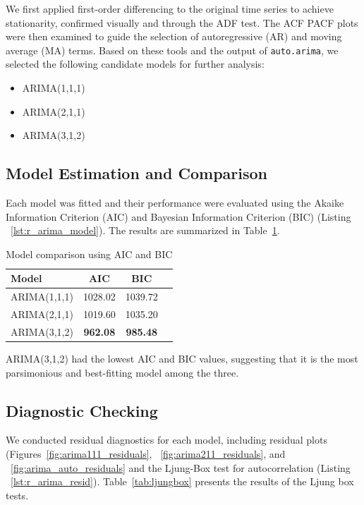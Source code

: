 \documentclass{article}
\begin{document}
We first applied first-order differencing to the original time series to achieve stationarity, confirmed visually and through the ADF test. The ACF PACF plots were then examined to guide the selection of autoregressive (AR) and moving average (MA) terms. Based on these tools and the output of \texttt{auto.arima}, we selected the following candidate models for further analysis:

\begin{itemize}
    \item ARIMA(1,1,1)
    \item ARIMA(2,1,1)
    \item ARIMA(3,1,2)
\end{itemize}

\subsection{Model Estimation and Comparison}

Each model was fitted and their performance were evaluated using the Akaike Information Criterion (AIC) and Bayesian Information Criterion (BIC) (Listing ~\ref{lst:r_arima_model}). The results are summarized in Table~\ref{tab:model_comparison}.

\begin{table}[h!]
\centering
\caption{Model comparison using AIC and BIC}
\label{tab:model_comparison}
\begin{tabular}{lccc}
\toprule
\textbf{Model} & \textbf{AIC} & \textbf{BIC} \\
\midrule
ARIMA(1,1,1) & 1028.02 & 1039.72  \\
ARIMA(2,1,1) & 1019.60 & 1035.20  \\
ARIMA(3,1,2) & \textbf{962.08} & \textbf{985.48}  \\
\bottomrule
\end{tabular}
\end{table}

ARIMA(3,1,2) had the lowest AIC and BIC values, suggesting that it is the most parsimonious and best-fitting model among the three.

\subsection{Diagnostic Checking}

We conducted residual diagnostics for each model, including residual plots (Figures~\ref{fig:arima111_residuals}, ~\ref{fig:arima211_residuals}, and ~\ref{fig:arima_auto_residuals}  and the Ljung-Box test for autocorrelation (Listing ~\ref{lst:r_arima_resid}). Table~\ref{tab:ljungbox} presents the results of the Ljung box tests.
\end{document}
